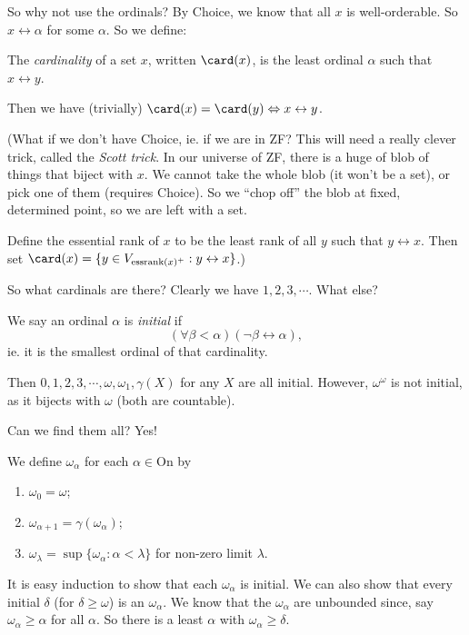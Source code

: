 \documentclass[a4paper]{article}
\begin{document}
So why not use the ordinals? By Choice, we know that all $x$ is well-orderable. So $x\leftrightarrow \alpha$ for some $\alpha$. So we define:
\begin{defi}[Cardinality]
  The \emph{cardinality} of a set $x$, written $\card(x)$, is the least ordinal $\alpha$ such that $x\leftrightarrow y$.
\end{defi}
Then we have (trivially) $\card(x) = \card(y) \Leftrightarrow x\leftrightarrow y$.

(What if we don't have Choice, ie. if we are in ZF? This will need a really clever trick, called the \emph{Scott trick}. In our universe of ZF, there is a huge of blob of things that biject with $x$. We cannot take the whole blob (it won't be a set), or pick one of them (requires Choice). So we ``chop off'' the blob at fixed, determined point, so we are left with a set.

Define the essential rank of $x$ to be the least rank of all $y$ such that $y\leftrightarrow x$. Then set $\card (x) = \{y\in V_{\mathrm{essrank}(x)^+}: y\leftrightarrow x\}$.)

So what cardinals are there? Clearly we have $1, 2, 3, \cdots$. What else?

\begin{defi}
  We say an ordinal $\alpha$ is \emph{initial} if
  \[
    (\forall \beta < \alpha)(\neg \beta \leftrightarrow \alpha),
  \]
  ie. it is the smallest ordinal of that cardinality.
\end{defi}

Then $0, 1, 2, 3, \cdots, \omega, \omega_1, \gamma(X)$ for any $X$ are all initial. However, $\omega^\omega$ is not initial, as it bijects with $\omega$ (both are countable).

Can we find them all? Yes!
\begin{defi}\index{$\omega_\alpha$}
  We define $\omega_\alpha$ for each $\alpha \in \mathrm{On}$ by
  \begin{enumerate}
    \item $\omega_0 = \omega$;
    \item $\omega_{\alpha + 1} = \gamma(\omega_\alpha)$;
    \item $\omega_\lambda = \sup\{\omega_\alpha: \alpha < \lambda\}$ for non-zero limit $\lambda$.
  \end{enumerate}
\end{defi}
It is easy induction to show that each $\omega_\alpha$ is initial. We can also show that every initial $\delta$ (for $\delta \geq \omega$) is an $\omega_\alpha$. We know that the $\omega_\alpha$ are unbounded since, say $\omega_\alpha \geq \alpha$ for all $\alpha$. So there is a least $\alpha$ with $\omega_\alpha \geq \delta$.
\end{document}
